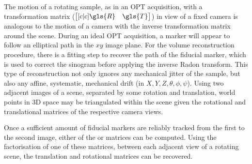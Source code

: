 \documentclass[times, twoside, watermark]{zHenriquesLab-StyleBioRxiv}
\begin{document}
The motion of a rotating sample, as in an \gls{OPT} acquisition, with a transformation matrix (\( \begin{bmatrix}[c|c] \gls{R} & \gls{T} \end{bmatrix}\)) in view of a fixed camera is analogous to the motion of a camera with the inverse transformation matrix around the scene. %
During an ideal \gls{OPT} acquisition, a marker will appear to follow an elliptical path in the \(xy\) image plane. For the volume reconstruction procedure, there is a fitting step to recover the path of the fiducial marker, which is used to correct the sinogram before applying the inverse \gls{Radon transform}. This type of reconstruction not only ignores any mechanical jitter of the sample, but also any affine, systematic, mechanical drift (in \(X,Y,Z,\theta,\phi,\psi \)). %
Using two adjacent images of a scene, separated by some rotation and translation, world points in 3D space may be triangulated within the scene given the rotational and translational matrices of the respective camera views.



Once a sufficient amount of fiducial markers are reliably tracked from the first to the second image, either of the  or  matrices can be computed. Using the factorisation of one of these matrices, between each adjacent view of a rotating scene, the translation and rotational matrices can be recovered.
\end{document}
